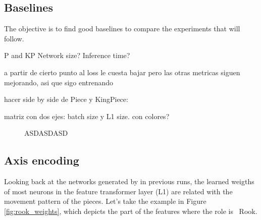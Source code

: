 \subsection{Baselines}

The objective is to find good baselines to compare the experiments that will follow.

P and KP
Network size?
Inference time?

a partir de cierto punto al loss le cuesta bajar pero las otras metricas siguen mejorando, asi que sigo entrenando

hacer side by side de Piece y KingPiece:

matriz con dos ejes: batch size y L1 size. con colores?

\begin{figure}[H]
\centering
{}
\caption{ASDASDASD}
\label{fig:asdasdasd}
\end{figure}



\newpage
\subsection{Axis encoding} %

\newcommand{\axisarrows}[1]{\parbox{0.7cm}{\texttt{[image: ../assets/arrows/\#1.pdf]}}}

Looking back at the networks generated by  in previous runs, the learned weigths of most neurons in the feature transformer layer (L1) are related with the movement pattern of the pieces. Let's take the example in Figure \ref{fig:rook_weights}, which depicts the  part of the features where the role is \symrook\ Rook.

